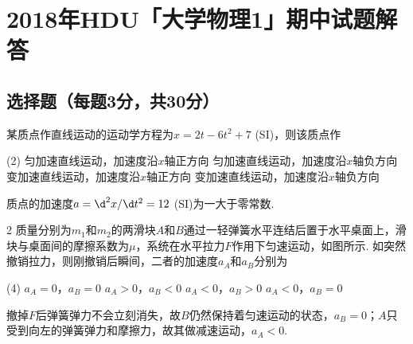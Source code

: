 \chapter*{2018年\textsf{HDU}「大学物理1」期中试题解答}



\section{选择题（每题3分，共30分）}

\begin{problem}
    某质点作直线运动的运动学方程为$x=2t-6t^2+7$ (SI)，则该质点作
    \begin{tasks}(2)
        \task 匀加速直线运动，加速度沿$x$轴正方向
        \task[\true] 匀加速直线运动，加速度沿$x$轴负方向
        \task 变加速直线运动，加速度沿$x$轴正方向
        \task 变加速直线运动，加速度沿$x$轴负方向
    \end{tasks}
\end{problem}
\begin{solution}
    质点的加速度$a=\d^2x/\d t^2=12$ (SI)为一大于零常数.
\end{solution}

\begin{problem} %
\begin{paracol}{2}
    质量分别为$m_1$和$m_2$的两滑块$A$和$B$通过一轻弹簧水平连结后置于水平桌面上，滑块与桌面间的摩擦系数为$\mu$，系统在水平拉力$F$作用下匀速运动，如图所示. 如突然撤销拉力，则刚撤销后瞬间，二者的加速度$a_A$和$a_B$分别为
    \switchcolumn\vspace*{\fill}\centering
    \vspace*{\fill}
\end{paracol}
\begin{tasks}(4)
    \task $a_A=0$，$a_B=0$
    \task $a_A>0$，$a_B<0$
    \task $a_A<0$，$a_B>0$
    \task[\true] $a_A<0$，$a_B=0$
\end{tasks}
\end{problem}
\begin{solution}
    撤掉$F$后弹簧弹力不会立刻消失，故$B$仍然保持着匀速运动的状态，$a_B=0$；$A$只受到向左的弹簧弹力和摩擦力，故其做减速运动，$a_A<0$.
\end{solution}

